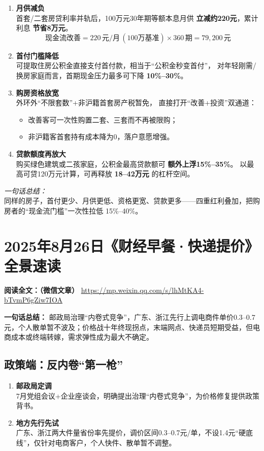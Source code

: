 \begin{enumerate}[leftmargin=*, nosep]
    \item \textbf{月供减负}  \\
    首套/二套房贷利率并轨后，100万元30年期等额本息月供 \textbf{立减约220元}，累计利息 \textbf{节省8万元}。  
    \[
        \text{现金流改善} = 220\,\text{元/月}\,(100\text{万基准}) \times 360\,\text{期} = 79{,}200\,\text{元}
    \]

    \item \textbf{首付门槛降低}  \\
    可提取住房公积金直接支付首付款，相当于“公积金秒变首付”，  
    对年轻刚需/换房家庭而言，首期现金压力最多可下降 \textbf{10\%–30\%}。

    \item \textbf{购房资格放宽}  \\
    外环外“不限套数”+非沪籍首套房产税暂免，  
    直接打开“改善+投资”双通道：  
    \begin{itemize}[nosep]
        \item 改善客可一次性购置二套、三套而不再被限购；  
        \item 非沪籍客首套持有成本降为0，落户意愿增强。
    \end{itemize}

    \item \textbf{贷款额度再放大}  \\
    购买绿色建筑或二孩家庭，公积金最高贷款额可 \textbf{额外上浮15\%–35\%}。  
    以最高可贷120万元计算，可再释放 \textbf{18–42万元} 的杠杆空间。
\end{enumerate}

\vspace{1em}
\noindent
\textit{一句话总结：}  \\
同样的房子，首付更少、月供更低、资格更宽、贷款更多——四重红利叠加，把购房者的“现金流门槛”一次性拉低 15\%–40\%。

\section{2025年8月26日《财经早餐·快递提价》全景速读}
\vspace{1cm}
\noindent\textbf{阅读全文：（微信文章）} \url{https://mp.weixin.qq.com/s/lhMtKA4-bTvmP6gZiw7IOA}

\textbf{一句话总结：}
邮政局治理“内卷式竞争”，广东、浙江先行上调电商件单价0.3–0.7元，个人散单暂不波及；价格战十年终现拐点，末端网点、快递员短期受益，但电商成本或终端转嫁，需求弹性成为最大不确定。

\subsection{政策端：反内卷“第一枪”}
\begin{enumerate}[leftmargin=*, nosep]
  \item \textbf{邮政局定调}  \\
  7月党组会议+企业座谈会，明确提出治理“内卷式竞争”，为价格修复提供政策背书。
  \item \textbf{地方先行先试}  \\
  广东、浙江两大件量省份率先提价，调价区间0.3–0.7元/单，不设1.4元“硬底线”，仅针对电商客户，个人快件、散单暂不调整。
\end{enumerate}

